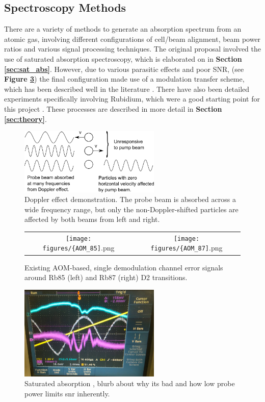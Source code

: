 \subsection{Spectroscopy Methods}

There are a variety of methods to generate an absorption spectrum from an atomic gas, involving different configurations of cell/beam alignment, beam power ratios and various signal processing techniques. The original proposal involved the use of saturated absorption spectroscopy, which is elaborated on in \textbf{Section \ref{sec:sat_abs}}. However, due to various parasitic effects and poor SNR, (see \textbf{Figure \ref{fig:sat_abs_bad}}) the final configuration made use of a modulation transfer scheme, which has been described well in the literature \cite{Shirley:82}. There have also been detailed experiments specifically involving Rubidium, which were a good starting point for this project \cite{0957-0233-19-10-105601}. These processes are described in more detail in \textbf{Section \ref{sec:theory}}.

\begin{figure}
    \centering
    \includegraphics[width=0.6\textwidth]{figures/doppler.png}
    \caption{Doppler effect demonstration.  The probe beam is absorbed across a wide frequency range, but only the non-Doppler-shifted particles are affected by both beams from left and right.}
    \label{fig:doppler}
\end{figure}

\begin{figure}
  \begin{tabular}{cc}
    \texttt{[image: figures/\{AOM\_85]}.png} &
    \texttt{[image: figures/\{AOM\_87]}.png} \\
  \end{tabular}
  \caption{Existing AOM-based, single demodulation channel error signals around Rb85 (left) and Rb87 (right) D2 transitions.}
  \label{fig:aom_spectra}
\end{figure}

\begin{figure}
    \centering
    \includegraphics[width=0.6\textwidth]{figures/best_sat_abs.png}
    \caption{Saturated absorption , blurb about why its bad and how low probe power limits snr inherently.}
    \label{fig:sat_abs_bad}
\end{figure}
